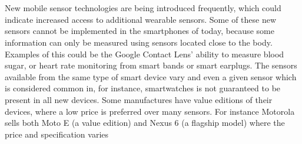 \\\\
New mobile sensor technologies are being introduced frequently, which could indicate increased access to additional wearable sensors. Some of these new sensors cannot be implemented in the smartphones of today, because some information can only be measured using sensors located close to the body. Examples of this could be the Google Contact Lens' ability to measure blood sugar, or heart rate monitoring from smart bands or smart earplugs. The sensors available from the same type of smart device vary and even a given sensor which is considered common in, for instance, smartwatches is not guaranteed to be present in all new devices. Some manufactures have value editions of their devices, where a low price is preferred over many sensors. For instance Motorola sells both Moto E (a value edition) and Nexus 6 (a flagship model) where the price and specification varies \parencite{moto_e_compared_to_nexus_6}


